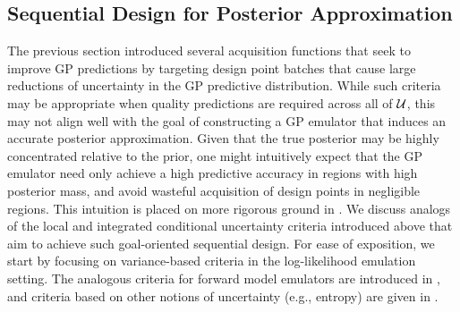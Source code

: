 \documentclass[12pt]{article}
\begin{document}
\subsection{Sequential Design for Posterior Approximation}
The previous section introduced several acquisition functions that seek to improve GP predictions by targeting
design point batches that cause large reductions of uncertainty in the GP predictive distribution.
While such criteria may be appropriate when quality predictions are required across all of $\mathcal{U}$, 
this may not align well with the goal of constructing a GP emulator that induces an accurate posterior 
approximation. Given that the true posterior may be highly concentrated relative to the prior, one might 
intuitively expect that the GP emulator need only achieve a high predictive accuracy in regions with high 
posterior mass, and avoid wasteful acquisition of design points in negligible regions.
This intuition is placed on more rigorous ground in \cite{StuartTeck2}.
We discuss analogs of the local and  integrated conditional uncertainty criteria introduced above that aim to 
achieve such goal-oriented sequential design. For ease of exposition, we start by focusing on variance-based
criteria in the log-likelihood emulation setting. The analogous criteria for forward model emulators are introduced 
in \todo, and criteria based on other notions of uncertainty (e.g., entropy) are given in \todo.
\end{document}
